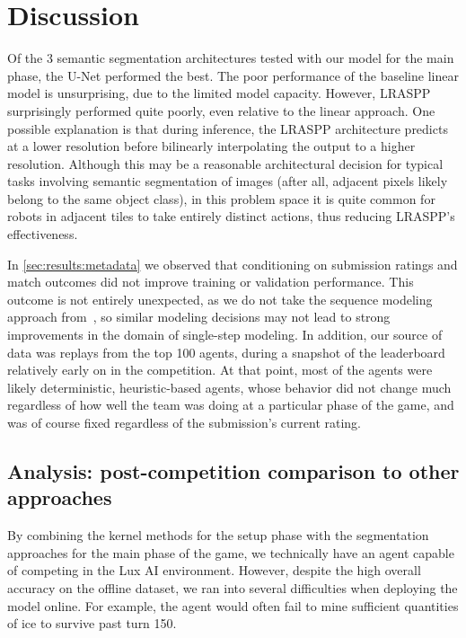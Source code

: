 \documentclass[10pt,twocolumn,letterpaper]{article}
\begin{document}
\section{Discussion}
\label{sec:discussion}

Of the 3 semantic segmentation architectures tested with our model for the
main phase, the U-Net performed the best. The poor performance of the baseline
linear model is unsurprising, due to the limited model capacity. However,
LRASPP surprisingly performed quite poorly, even relative to the linear
approach. One possible explanation is that during inference, the LRASPP
architecture predicts at a lower resolution before bilinearly interpolating
the output to a higher resolution. Although this may be a reasonable
architectural decision for typical tasks involving semantic segmentation of
images (after all, adjacent pixels likely belong to the same object class),
in this problem space it is quite common for robots in adjacent tiles to
take entirely distinct actions, thus reducing LRASPP's effectiveness.

In \autoref{sec:results:metadata} we observed that conditioning on submission
ratings and match outcomes did not improve training or validation performance.
This outcome is not entirely unexpected, as we do not take the
sequence modeling approach from~\cite{decision_transformers}, so
similar modeling decisions may not lead to strong improvements
in the domain of single-step modeling.
In addition, our source of data was replays from the top 100 agents, during
a snapshot of the leaderboard relatively early on in the competition.
At that point, most of the agents were likely deterministic, heuristic-based
agents, whose behavior did not change much regardless of how well the team was
doing at a particular phase of the game, and was of course fixed regardless of
the submission's current rating.

\subsection{Analysis: post-competition comparison to other approaches}
\label{sec:discussion:compare}

By combining the kernel methods for the setup phase with the
segmentation approaches for the main phase of the game, we technically
have an agent capable of competing in the Lux AI environment.
However, despite the high overall accuracy on the offline dataset,
we ran into several difficulties when deploying the model online.
For example, the agent would often fail to mine
sufficient quantities of ice to survive past turn 150.
\end{document}
